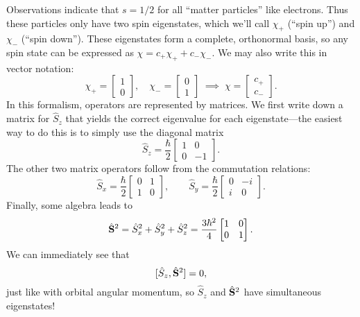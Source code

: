 \documentclass[../p052main.tex]{subfiles}
\begin{document}
Observations indicate that $s = 1/2$ for all ``matter particles'' like electrons.
Thus these particles only have two spin eigenstates, which we'll call $\chi_+$ (``spin up'') and $\chi_-$ (``spin down'').
These eigenstates form a complete, orthonormal basis, so any spin state can be expressed as $\chi = c_+ \chi_+ + c_- \chi_-$.
We may also write this in vector notation:
\[ \chi_+ = \begin{bmatrix} 1 \\ 0 \end{bmatrix}, \quad \chi_- = \begin{bmatrix} 0 \\ 1 \end{bmatrix} \;\implies\; \chi = \begin{bmatrix} c_+ \\ c_- \end{bmatrix}. \]
In this formalism, operators are represented by matrices.
We first write down a matrix for $\hat S_z$ that yields the correct eigenvalue for each eigenstate---the easiest way to do this is to simply use the diagonal matrix
\[ \hat S_z = \frac{\hbar}{2} \begin{bmatrix} 1 & 0 \\ 0 & -1 \end{bmatrix}. \]
The other two matrix operators follow from the commutation relations:
\[ \hat S_x = \frac{\hbar}{2} \begin{bmatrix} 0 & 1 \\ 1 & 0 \end{bmatrix}, \qquad \hat S_y = \frac{\hbar}{2} \begin{bmatrix} 0 & -i \\ i & 0 \end{bmatrix}. \]
Finally, some algebra leads to
\[ \hat{\mathbf{S}}^2 = \hat S_x^2 + \hat S_y^2 + \hat S_z^2 = \frac{3\hbar^2}{4} \begin{bmatrix} 1 & 0 \\ 0 & 1 \end{bmatrix}. \]
We can immediately see that
\[ [\hat S_z, \hat{\mathbf{S}}^2] = 0, \]
just like with orbital angular momentum, so $\hat S_z$ and $\hat{\mathbf{S}}^2$ have simultaneous eigenstates!
\end{document}
